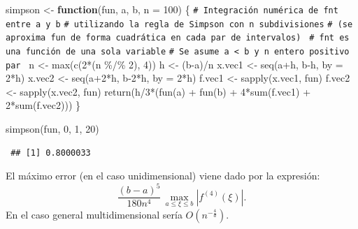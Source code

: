 \documentclass[
]{book}
\newenvironment{Shaded}{\begin{snugshade}}{\end{snugshade}}
\newcommand{\AttributeTok}[1]{\textcolor[rgb]{0.77,0.63,0.00}{#1}}
\newcommand{\CommentTok}[1]{\textcolor[rgb]{0.56,0.35,0.01}{\textit{#1}}}
\newcommand{\ControlFlowTok}[1]{\textcolor[rgb]{0.13,0.29,0.53}{\textbf{#1}}}
\newcommand{\DecValTok}[1]{\textcolor[rgb]{0.00,0.00,0.81}{#1}}
\newcommand{\FunctionTok}[1]{\textcolor[rgb]{0.00,0.00,0.00}{#1}}
\newcommand{\NormalTok}[1]{#1}
\newcommand{\OtherTok}[1]{\textcolor[rgb]{0.56,0.35,0.01}{#1}}
\newcommand{\SpecialCharTok}[1]{\textcolor[rgb]{0.00,0.00,0.00}{#1}}
\theoremstyle{break}
\theoremstyle{nonumberplain}
\renewcommand{\CommentTok}[1]{\textcolor[rgb]{0.41,0.41,0.41}{\texttt{#1}}}
\begin{document}
\begin{Shaded}
\begin{Highlighting}[]
\NormalTok{simpson }\OtherTok{\textless{}{-}} \ControlFlowTok{function}\NormalTok{(fun, a, b, }\AttributeTok{n =} \DecValTok{100}\NormalTok{) \{ }
\CommentTok{\# Integración numérica de fnt entre a y b}
\CommentTok{\# utilizando la regla de Simpson con n subdivisiones}
\CommentTok{\# (se aproxima fun de forma cuadrática en cada par de intervalos)  }
\CommentTok{\# fnt es una función de una sola variable}
\CommentTok{\# Se asume a \textless{} b y n entero positivo par }
\NormalTok{  n }\OtherTok{\textless{}{-}} \FunctionTok{max}\NormalTok{(}\FunctionTok{c}\NormalTok{(}\DecValTok{2}\SpecialCharTok{*}\NormalTok{(n }\SpecialCharTok{\%/\%} \DecValTok{2}\NormalTok{), }\DecValTok{4}\NormalTok{))}
\NormalTok{  h }\OtherTok{\textless{}{-}}\NormalTok{ (b}\SpecialCharTok{{-}}\NormalTok{a)}\SpecialCharTok{/}\NormalTok{n}
\NormalTok{  x.vec1 }\OtherTok{\textless{}{-}} \FunctionTok{seq}\NormalTok{(a}\SpecialCharTok{+}\NormalTok{h, b}\SpecialCharTok{{-}}\NormalTok{h, }\AttributeTok{by =} \DecValTok{2}\SpecialCharTok{*}\NormalTok{h)}
\NormalTok{  x.vec2 }\OtherTok{\textless{}{-}} \FunctionTok{seq}\NormalTok{(a}\SpecialCharTok{+}\DecValTok{2}\SpecialCharTok{*}\NormalTok{h, b}\DecValTok{{-}2}\SpecialCharTok{*}\NormalTok{h, }\AttributeTok{by =} \DecValTok{2}\SpecialCharTok{*}\NormalTok{h)}
\NormalTok{  f.vec1 }\OtherTok{\textless{}{-}} \FunctionTok{sapply}\NormalTok{(x.vec1, fun)}
\NormalTok{  f.vec2 }\OtherTok{\textless{}{-}} \FunctionTok{sapply}\NormalTok{(x.vec2, fun)}
  \FunctionTok{return}\NormalTok{(h}\SpecialCharTok{/}\DecValTok{3}\SpecialCharTok{*}\NormalTok{(}\FunctionTok{fun}\NormalTok{(a) }\SpecialCharTok{+} \FunctionTok{fun}\NormalTok{(b) }\SpecialCharTok{+} \DecValTok{4}\SpecialCharTok{*}\FunctionTok{sum}\NormalTok{(f.vec1) }\SpecialCharTok{+} \DecValTok{2}\SpecialCharTok{*}\FunctionTok{sum}\NormalTok{(f.vec2)))}
\NormalTok{\}}

\FunctionTok{simpson}\NormalTok{(fun, }\DecValTok{0}\NormalTok{, }\DecValTok{1}\NormalTok{, }\DecValTok{20}\NormalTok{)}
\end{Highlighting}
\end{Shaded}

\begin{verbatim}
 ## [1] 0.8000033
\end{verbatim}

El máximo error (en el caso unidimensional) viene dado por la expresión:
\[\frac{(b-a)^5}{180n^4}\,\max_{a\leq \xi \leq b}\left| f^{(4)}(\xi) \right|.\]
En el caso general multidimensional sería \(O(n^{-\frac{4}{d}})\).
\end{document}
